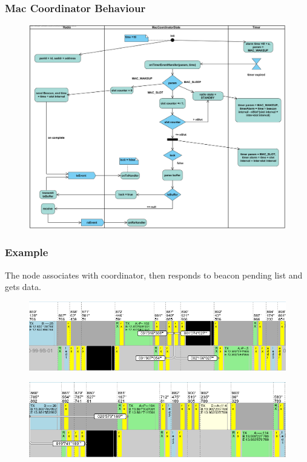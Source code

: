 \begin{frame}[fragile]
  \frametitle{Mac Coordinator Behaviour}
  \vspace{-2.7em}
  \begin{figure}
    \centering
    \includegraphics[width=.99\textwidth]{img/MAC_COORDINATOR.png}
  \end{figure}
\end{frame}

\begin{frame}[fragile]
  \frametitle{Example}
  \vspace{-2em}
  The node associates with coordinator, then responds to beacon pending list and gets data.
  \begin{figure}
    \centering
    \includegraphics[width=\textwidth]{img/associazione.png}
  \end{figure}
  \begin{figure}
    \centering
    \includegraphics[width=\textwidth]{img/dataIndirect.png}
  \end{figure}
\end{frame}

